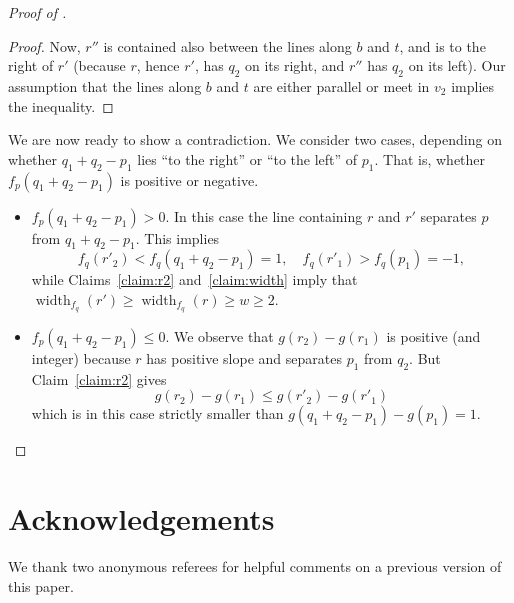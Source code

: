 \documentclass[12pt]{article}
\newcommand{\width}{\operatorname{width}}
\begin{document}
\begin{proof}[Proof of ]
\begin{proof}
Now, $r''$ is contained also between the lines  along $b$ and $t$, and is to the right of $r'$ (because $r$, hence $r'$, has $q_2$ on its right, and $r''$ has $q_2$ on its left). Our assumption that the lines along $b$ and $t$ are either parallel or meet in $v_2$ implies the inequality.
\end{proof}


We are now ready to show a contradiction. We consider two cases, depending on whether $q_1+q_2-p_1$ lies ``to the right'' or ``to the left'' of $p_1$. That is, whether $f_p(q_1+q_2-p_1)$ is positive or negative. %

\begin{itemize}
\item \underline{$f_p(q_1+q_2-p_1)> 0$}. In this case the line containing $r$ and $r'$ separates $p$ from  $q_1+q_2-p_1$.
This implies
\[
f_q(r'_2) < f_q(q_1+q_2-p_1) = 1, \quad f_q(r'_1) > f_q(p_1) =-1,
\]
while Claims~\ref{claim:r2} and~\ref{claim:width} imply that $\width_{f_q}(r')\ge \width_{f_q}(r)  \ge w\ge 2$.

\item \underline{$f_p(q_1+q_2-p_1)\le 0$}.
We observe that $g(r_2) - g(r_1)$ is positive (and integer) because $r$ has positive slope and separates $p_1$ from $q_2$. But Claim~\ref{claim:r2} gives
\[
g(r_2) - g(r_1) \le g(r'_2) - g(r'_1) 
\]
which is in this case strictly smaller than $g(q_1+q_2-p_1) - g(p_1) =1$.
\qedhere
\end{itemize}
\end{proof}




\section*{Acknowledgements}
We  thank two anonymous referees for helpful comments on a previous version of this paper.


\end{document}
